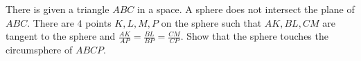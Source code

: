 There is given a triangle $ABC$ in a space. A sphere does not intersect the plane of $ABC$. There are $4$ points $K, L, M, P$ on the sphere such that $AK, BL, CM$ are tangent to the sphere and $\frac{AK}{AP} = \frac{BL}{BP} = \frac{CM}{CP}$. Show that the sphere touches the circumsphere of $ABCP$.